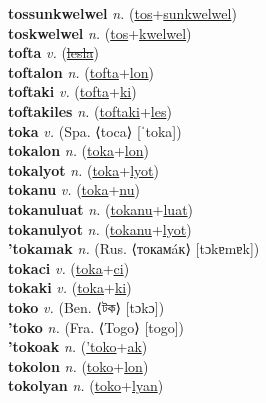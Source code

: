 \textbf{tossunkwelwel} \textit{n.} (\hyperref[tos]{tos}+\hyperref[sunkwelwel]{sunkwelwel})
 \label{tossunkwelwel} \\
\textbf{toskwelwel} \textit{n.} (\hyperref[tos]{tos}+\hyperref[kwelwel]{kwelwel})
 \label{toskwelwel} \\
\textbf{tofta} \textit{v.} (\hyperref[lesla]{\sout{lesla}})
 \label{tofta} \\
\textbf{toftalon} \textit{n.} (\hyperref[tofta]{tofta}+\hyperref[lon]{lon})
 \label{toftalon} \\
\textbf{toftaki} \textit{v.} (\hyperref[tofta]{tofta}+\hyperref[ki]{ki})
 \label{toftaki} \\
\textbf{toftakiles} \textit{n.} (\hyperref[toftaki]{toftaki}+\hyperref[les]{les})
 \label{toftakiles} \\
\textbf{toka} \textit{v.} (Spa. ⟨toca⟩ [ˈtoka])
 \label{toka} \\
\textbf{tokalon} \textit{n.} (\hyperref[toka]{toka}+\hyperref[lon]{lon})
 \label{tokalon} \\
\textbf{tokalyot} \textit{n.} (\hyperref[toka]{toka}+\hyperref[lyot]{lyot})
 \label{tokalyot} \\
\textbf{tokanu} \textit{v.} (\hyperref[toka]{toka}+\hyperref[nu]{nu})
 \label{tokanu} \\
\textbf{tokanuluat} \textit{n.} (\hyperref[tokanu]{tokanu}+\hyperref[luat]{luat})
 \label{tokanuluat} \\
\textbf{tokanulyot} \textit{n.} (\hyperref[tokanu]{tokanu}+\hyperref[lyot]{lyot})
 \label{tokanulyot} \\
\textbf{'tokamak} \textit{n.} (Rus. ⟨токамáк⟩ [tɔkɐmɐk])
 \label{'tokamak} \\
\textbf{tokaci} \textit{v.} (\hyperref[toka]{toka}+\hyperref[ci]{ci})
 \label{tokaci} \\
\textbf{tokaki} \textit{v.} (\hyperref[toka]{toka}+\hyperref[ki]{ki})
 \label{tokaki} \\
\textbf{toko} \textit{v.} (Ben. ⟨টক⟩ [tɔkɔ])
 \label{toko} \\
\textbf{'toko} \textit{n.} (Fra. ⟨Togo⟩ [togo])
 \label{'toko} \\
\textbf{'tokoak} \textit{n.} (\hyperref['toko]{'toko}+\hyperref[ak]{ak})
 \label{'tokoak} \\
\textbf{tokolon} \textit{n.} (\hyperref[toko]{toko}+\hyperref[lon]{lon})
 \label{tokolon} \\
\textbf{tokolyan} \textit{n.} (\hyperref[toko]{toko}+\hyperref[lyan]{lyan})
 \label{tokolyan} \\
